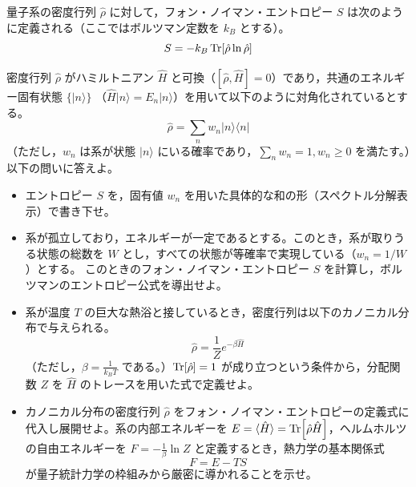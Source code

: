 \documentclass[dvipdfmx,b5paper,twoside]{jsarticle}
\begin{document}
量子系の密度行列 $\hat{\rho}$ に対して，フォン・ノイマン・エントロピー $S$ は次のように定義される（ここではボルツマン定数を $k_B$ とする）。
  \begin{equation}
  S = -k_B \Tr[\hat{\rho} \ln \hat{\rho}]
  \end{equation}
  
  
密度行列 $\hat{\rho}$ がハミルトニアン $\hat{H}$ と可換（$[\hat{\rho}, \hat{H}] = 0$）であり，共通のエネルギー固有状態 $\{|n\rangle\}$ （$\hat{H}|n\rangle = E_n|n\rangle$）を用いて以下のように対角化されているとする。
\begin{equation}
  \hat{\rho} = \sum_n w_n |n\rangle\langle n|
\end{equation}
（ただし，$w_n$ は系が状態 $|n\rangle$ にいる確率であり，$\sum_n w_n = 1, w_n \ge 0$ を満たす。）以下の問いに答えよ。
\begin{itemize}
  \item[(1)] エントロピー $S$ を，固有値 $w_n$ を用いた具体的な和の形（スペクトル分解表示）で書き下せ。
  \item[(2)] 系が孤立しており，エネルギーが一定であるとする。このとき，系が取りうる状態の総数を $W$ とし，すべての状態が等確率で実現している（$w_n = 1/W$）とする。
このときのフォン・ノイマン・エントロピー $S$ を計算し，ボルツマンのエントロピー公式を導出せよ。
  \item[(3)] 系が温度 $T$ の巨大な熱浴と接しているとき，密度行列は以下のカノニカル分布で与えられる。
  \begin{equation}
    \hat{\rho} = \frac{1}{Z} e^{-\beta \hat{H}}
  \end{equation}
  （ただし，$\beta = \frac{1}{k_B T}$ である。）$\Tr[\hat{\rho}] = 1$ が成り立つという条件から，分配関数 $Z$ を $\hat{H}$ のトレースを用いた式で定義せよ。
  \item[(4)] カノニカル分布の密度行列 $\hat{\rho}$ をフォン・ノイマン・エントロピーの定義式に代入し展開せよ。系の内部エネルギーを $E = \langle \hat{H} \rangle = \Tr[\hat{\rho} \hat{H}]$，ヘルムホルツの自由エネルギーを $F = -\frac{1}{\beta} \ln Z$ と定義するとき，熱力学の基本関係式
  \begin{equation}
    F = E - TS
  \end{equation}
  が量子統計力学の枠組みから厳密に導かれることを示せ。
\end{itemize}
\end{document}
